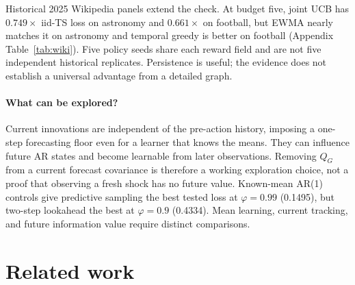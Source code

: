 \documentclass[sigconf,review,anonymous]{acmart}
\begin{document}
Historical 2025 Wikipedia panels extend the check. At budget five, joint UCB has $0.749\times$ iid-TS loss on astronomy and $0.661\times$ on football, but EWMA nearly matches it on astronomy and temporal greedy is better on football (Appendix Table~\ref{tab:wiki}). Five policy seeds share each reward field and are not five independent historical replicates. Persistence is useful; the evidence does not establish a universal advantage from a detailed graph.

\paragraph{What can be explored?} Current innovations are independent of the pre-action history, imposing a one-step forecasting floor even for a learner that knows the means. They can influence future AR states and become learnable from later observations. Removing $Q_G$ from a current forecast covariance is therefore a working exploration choice, not a proof that observing a fresh shock has no future value. Known-mean AR(1) controls give predictive sampling the best tested loss at $\varphi=0.99$ (0.1495), but two-step lookahead the best at $\varphi=0.9$ (0.4334). Mean learning, current tracking, and future information value require distinct comparisons.

\section{Related work}\label{sec:related}
\end{document}
